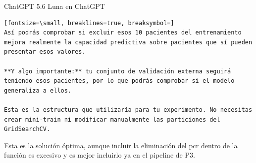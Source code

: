\documentclass[12pt,a4paper,oneside]{book}
\begin{document}
\begin{iaresp}{ChatGPT 5.6 Luna en ChatGPT}
\begin{Verbatim}[fontsize=\small, breaklines=true, breaksymbol=]
Así podrás comprobar si excluir esos 10 pacientes del entrenamiento mejora realmente la capacidad predictiva sobre pacientes que sí pueden presentar esos valores.

**Y algo importante:** tu conjunto de validación externa seguirá teniendo esos pacientes, por lo que podrás comprobar si el modelo generaliza a ellos.

Esta es la estructura que utilizaría para tu experimento. No necesitas crear mini-train ni modificar manualmente las particiones del GridSearchCV.
\end{Verbatim}
\end{iaresp}
\begin{iaanalisis}
Esta es la solución óptima, aunque incluir la eliminación del pcr dentro de la función es excesivo y es mejor incluirlo ya en el pipeline de P3.
\end{iaanalisis}
\end{document}
